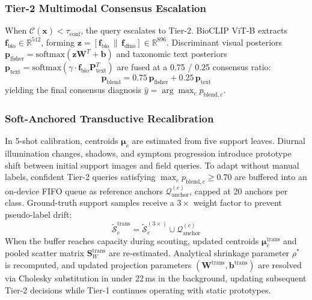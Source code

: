 \documentclass[a4paper,fleqn,nologo]{cas-dc}
\begin{document}
\subsubsection{Tier-2 Multimodal Consensus Escalation}
When $\mathcal{C}(\mathbf{x}) < \tau_{\text{conf}}$, the query escalates to Tier-2. BioCLIP ViT-B extracts $\mathbf{f}_{\text{bio}} \in \mathbb{R}^{512}$, forming $\mathbf{z} = [\mathbf{f}_{\text{bio}} \,\|\, \mathbf{f}_{\text{dino}}] \in \mathbb{R}^{896}$. Discriminant visual posteriors $\mathbf{p}_{\text{fisher}} = \text{softmax}(\mathbf{z}\mathbf{W}^T + \mathbf{b})$ and taxonomic text posteriors $\mathbf{p}_{\text{text}} = \text{softmax}(\gamma \cdot \mathbf{f}_{\text{bio}}\mathbf{P}_{\text{text}}^T)$ are fused at a 0.75 / 0.25 consensus ratio:
\begin{equation}
    \label{eq:multimodal_blend}
    \mathbf{p}_{\text{blend}} = 0.75 \, \mathbf{p}_{\text{fisher}} + 0.25 \, \mathbf{p}_{\text{text}}
\end{equation}
yielding the final consensus diagnosis $\hat{y} = \arg\max_c p_{\text{blend}, c}$.

\subsubsection{Soft-Anchored Transductive Recalibration}
\label{sec:transductive}
In 5-shot calibration, centroids $\boldsymbol{\mu}_c$ are estimated from five support leaves. Diurnal illumination changes, shadows, and symptom progression introduce prototype shift between initial support images and field queries. To adapt without manual labels, confident Tier-2 queries satisfying $\max_c p_{\text{blend}, c} \ge 0.70$ are buffered into an on-device FIFO queue as reference anchors $\mathcal{Q}_{\text{anchor}}^{(c)}$, capped at 20 anchors per class. Ground-truth support samples receive a $3\times$ weight factor to prevent pseudo-label drift:
\begin{equation}
    \tilde{\mathcal{S}}_c^{\text{trans}} = \tilde{\mathcal{S}}_c^{(3\times)} \cup \mathcal{Q}_{\text{anchor}}^{(c)}
\end{equation}
When the buffer reaches capacity during scouting, updated centroids $\boldsymbol{\mu}_c^{\text{trans}}$ and pooled scatter matrix $\mathbf{S}_W^{\text{trans}}$ are re-estimated. Analytical shrinkage parameter $\rho^*$ is recomputed, and updated projection parameters $(\mathbf{W}^{\text{trans}}, \mathbf{b}^{\text{trans}})$ are resolved via Cholesky substitution in under 22\,ms in the background, updating subsequent Tier-2 decisions while Tier-1 continues operating with static prototypes.
\end{document}
